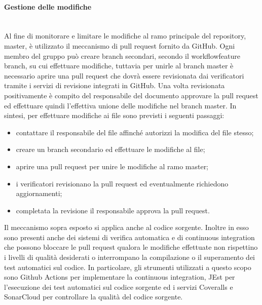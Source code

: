	\paragraph{Gestione delle modifiche}\mbox{}\\ [1mm]
		Al fine di monitorare e limitare le modifiche al ramo principale del repository\glo, master, è utilizzato il meccanismo di pull request fornito da GitHub. Ogni membro del gruppo può creare branch secondari, secondo il workflow\glosp feature branch, su cui effettuare modifiche, tuttavia per unirle al branch master è necessario aprire una pull request che dovrà essere revisionata dai verificatori tramite i servizi di revisione integrati in GitHub. Una volta revisionata positivamente è compito del responsabile del documento approvare la pull request ed effettuare quindi l'effettiva unione delle modifiche nel branch master.
		\newline
		In sintesi, per effettuare modifiche ai file sono previsti i seguenti passaggi:
		\begin{itemize}
			\item contattare il responsabile del file affinché autorizzi la modifica del file stesso;
			\item creare un branch secondario ed effettuare le modifiche al file;
			\item aprire una pull request per unire le modifiche al ramo master;
			\item i verificatori revisionano la pull request ed eventualmente richiedono aggiornamenti;
			\item completata la revisione il responsabile approva la pull request.
		\end{itemize}
	
		Il meccanismo sopra esposto si applica anche al codice sorgente. Inoltre in esso sono presenti anche dei sistemi di verifica automatica e di continuous integration che possono bloccare le pull request qualora le modifiche effettuate non rispettino i livelli di qualità desiderati o interrompano la compilazione o il superamento dei test automatici sul codice. In particolare, gli strumenti utilizzati a questo scopo sono Github Actions per implementare la continuous integration, JEst per l'esecuzione dei test automatici sul codice sorgente ed i servizi Coveralls e SonarCloud per controllare la qualità del codice sorgente.
		
